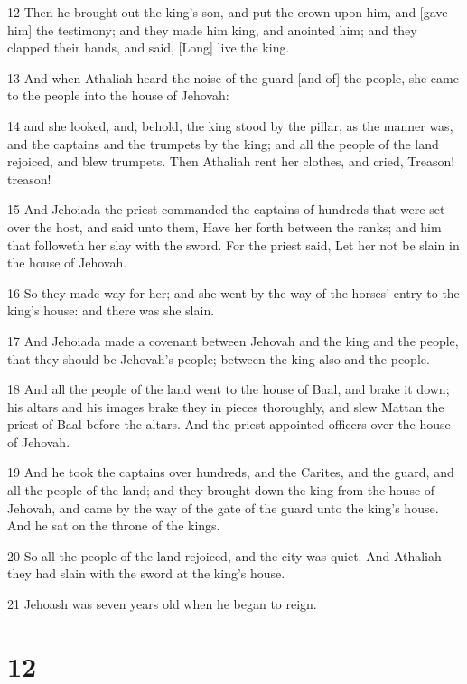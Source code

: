 \par 12 Then he brought out the king's son, and put the crown upon him, and [gave him] the testimony; and they made him king, and anointed him; and they clapped their hands, and said, [Long] live the king.
\par 13 And when Athaliah heard the noise of the guard [and of] the people, she came to the people into the house of Jehovah:
\par 14 and she looked, and, behold, the king stood by the pillar, as the manner was, and the captains and the trumpets by the king; and all the people of the land rejoiced, and blew trumpets. Then Athaliah rent her clothes, and cried, Treason! treason!
\par 15 And Jehoiada the priest commanded the captains of hundreds that were set over the host, and said unto them, Have her forth between the ranks; and him that followeth her slay with the sword. For the priest said, Let her not be slain in the house of Jehovah.
\par 16 So they made way for her; and she went by the way of the horses' entry to the king's house: and there was she slain.
\par 17 And Jehoiada made a covenant between Jehovah and the king and the people, that they should be Jehovah's people; between the king also and the people.
\par 18 And all the people of the land went to the house of Baal, and brake it down; his altars and his images brake they in pieces thoroughly, and slew Mattan the priest of Baal before the altars. And the priest appointed officers over the house of Jehovah.
\par 19 And he took the captains over hundreds, and the Carites, and the guard, and all the people of the land; and they brought down the king from the house of Jehovah, and came by the way of the gate of the guard unto the king's house. And he sat on the throne of the kings.
\par 20 So all the people of the land rejoiced, and the city was quiet. And Athaliah they had slain with the sword at the king's house.
\par 21 Jehoash was seven years old when he began to reign.

\chapter{12}


